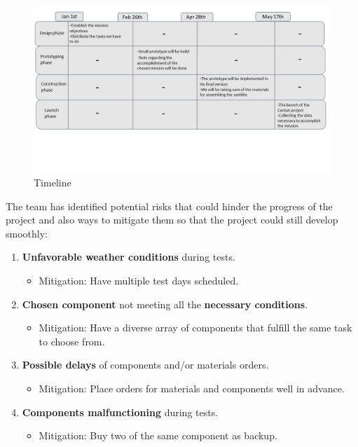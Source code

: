 \documentclass[11pt]{article}
\begin{document}
\begin{figure}[H]
\includegraphics[width=15cm]{Timeline}
\centering
\caption{Timeline}
\end{figure}

\hspace{0.5cm} The team has identified potential risks that could hinder the progress of the project and also ways to mitigate them so that the project could still develop smoothly:
\begin{enumerate}
\item \textbf{Unfavorable weather conditions} during tests.

\begin{itemize}
\item Mitigation: Have multiple test days scheduled.
\end{itemize}

\item \textbf{Chosen component} not meeting all the \textbf{necessary conditions}.

\begin{itemize}
\item Mitigation: Have a diverse array of components that fulfill the same task to choose from.
\end{itemize}

\item \textbf{Possible delays} of components and/or materials orders.

\begin{itemize}
\item Mitigation: Place orders for materials and components well in advance.
\end{itemize}

\item \textbf{Components malfunctioning} during tests.

\begin{itemize}
\item Mitigation: Buy two of the same component as backup.
\end{itemize}

\end{enumerate}
\end{document}
